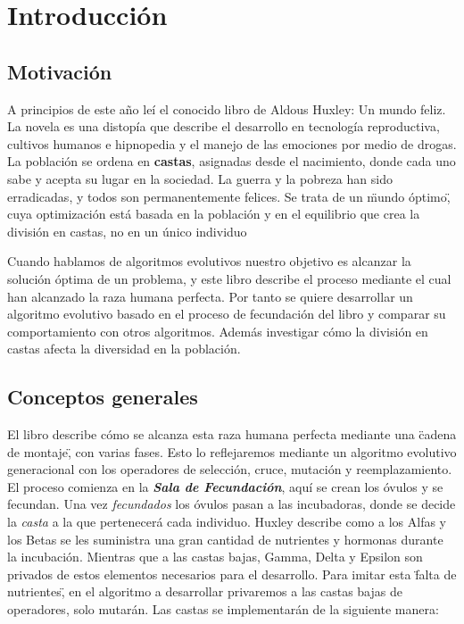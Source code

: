 \chapter{Introducción}

\section{Motivación}

A principios de este año leí el conocido libro de Aldous Huxley: Un mundo feliz. La novela es una
distopía que describe el desarrollo en tecnología reproductiva, cultivos humanos e hipnopedia y el manejo de las
emociones por medio de drogas. La población se ordena en \textbf{castas}, asignadas desde el nacimiento, donde cada uno
sabe y acepta su lugar en la sociedad. La guerra y la pobreza han sido erradicadas, y todos son permanentemente
felices. Se trata de un \"mundo óptimo\", cuya optimización está basada en la población y en el equilibrio que crea
la división en castas, no en un único individuo 

Cuando hablamos de algoritmos evolutivos nuestro objetivo es alcanzar la solución óptima de un problema, y este libro describe el 
proceso mediante el cual han alcanzado la raza humana perfecta. Por tanto se quiere desarrollar un algoritmo evolutivo basado en 
el proceso de fecundación del libro y comparar su comportamiento con otros algoritmos. Además investigar cómo la división en castas afecta 
la diversidad en la población.

\section{Conceptos generales}

El libro describe cómo se alcanza esta raza humana perfecta mediante una \"cadena de montaje\", con varias fases. Esto lo reflejaremos mediante 
un algoritmo evolutivo generacional con los operadores de selección, cruce, mutación y reemplazamiento. El proceso comienza en la \textbf{\textit{Sala de Fecundación}}, 
aquí se crean los óvulos y se fecundan. Una vez \textit{fecundados} los óvulos pasan a las incubadoras, donde se decide la \textit{casta} a la que pertenecerá cada individuo. Huxley
describe como a los Alfas y los Betas se les suministra una gran cantidad de nutrientes y hormonas durante la incubación. Mientras que a las castas bajas, Gamma, Delta y
Epsilon son privados de estos elementos necesarios para el desarrollo. Para imitar esta \"falta de nutrientes\", en el algoritmo a desarrollar privaremos a las castas bajas de
operadores, solo mutarán. Las castas se implementarán de la siguiente manera: 

